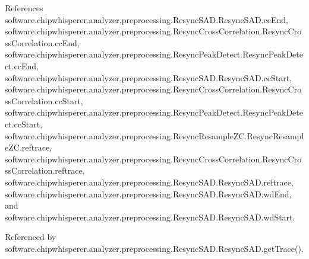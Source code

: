 References software.\+chipwhisperer.\+analyzer.\+preprocessing.\+Resync\+S\+A\+D.\+Resync\+S\+A\+D.\+cc\+End, software.\+chipwhisperer.\+analyzer.\+preprocessing.\+Resync\+Cross\+Correlation.\+Resync\+Cross\+Correlation.\+cc\+End, software.\+chipwhisperer.\+analyzer.\+preprocessing.\+Resync\+Peak\+Detect.\+Resync\+Peak\+Detect.\+cc\+End, software.\+chipwhisperer.\+analyzer.\+preprocessing.\+Resync\+S\+A\+D.\+Resync\+S\+A\+D.\+cc\+Start, software.\+chipwhisperer.\+analyzer.\+preprocessing.\+Resync\+Cross\+Correlation.\+Resync\+Cross\+Correlation.\+cc\+Start, software.\+chipwhisperer.\+analyzer.\+preprocessing.\+Resync\+Peak\+Detect.\+Resync\+Peak\+Detect.\+cc\+Start, software.\+chipwhisperer.\+analyzer.\+preprocessing.\+Resync\+Resample\+Z\+C.\+Resync\+Resample\+Z\+C.\+reftrace, software.\+chipwhisperer.\+analyzer.\+preprocessing.\+Resync\+Cross\+Correlation.\+Resync\+Cross\+Correlation.\+reftrace, software.\+chipwhisperer.\+analyzer.\+preprocessing.\+Resync\+S\+A\+D.\+Resync\+S\+A\+D.\+reftrace, software.\+chipwhisperer.\+analyzer.\+preprocessing.\+Resync\+S\+A\+D.\+Resync\+S\+A\+D.\+wd\+End, and software.\+chipwhisperer.\+analyzer.\+preprocessing.\+Resync\+S\+A\+D.\+Resync\+S\+A\+D.\+wd\+Start.



Referenced by software.\+chipwhisperer.\+analyzer.\+preprocessing.\+Resync\+S\+A\+D.\+Resync\+S\+A\+D.\+get\+Trace().


